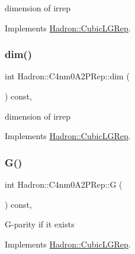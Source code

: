 dimension of irrep 

Implements \mbox{\hyperlink{structHadron_1_1CubicLGRep_a3acbaea26503ed64f20df693a48e4cdd}{Hadron\+::\+Cubic\+L\+G\+Rep}}.

\mbox{\label{structHadron_1_1C4nm0A2PRep_a5a7d243b4be2939bb39515b7563a804d}} 
\subsubsection{\texorpdfstring{dim()}{dim()}\hspace{0.1cm}{\footnotesize\ttfamily [3/3]}}
{\footnotesize\ttfamily int Hadron\+::\+C4nm0\+A2\+P\+Rep\+::dim (\begin{DoxyParamCaption}{ }\end{DoxyParamCaption}) const\hspace{0.3cm}{\ttfamily [inline]}, {\ttfamily [virtual]}}

dimension of irrep 

Implements \mbox{\hyperlink{structHadron_1_1CubicLGRep_a3acbaea26503ed64f20df693a48e4cdd}{Hadron\+::\+Cubic\+L\+G\+Rep}}.

\mbox{\label{structHadron_1_1C4nm0A2PRep_a8340077e9f3fea9b7b6421d3e9068d47}} 
\subsubsection{\texorpdfstring{G()}{G()}\hspace{0.1cm}{\footnotesize\ttfamily [1/3]}}
{\footnotesize\ttfamily int Hadron\+::\+C4nm0\+A2\+P\+Rep\+::G (\begin{DoxyParamCaption}{ }\end{DoxyParamCaption}) const\hspace{0.3cm}{\ttfamily [inline]}, {\ttfamily [virtual]}}

G-\/parity if it exists 

Implements \mbox{\hyperlink{structHadron_1_1CubicLGRep_ace26f7b2d55e3a668a14cb9026da5231}{Hadron\+::\+Cubic\+L\+G\+Rep}}.

\mbox{\label{structHadron_1_1C4nm0A2PRep_a8340077e9f3fea9b7b6421d3e9068d47}} 
